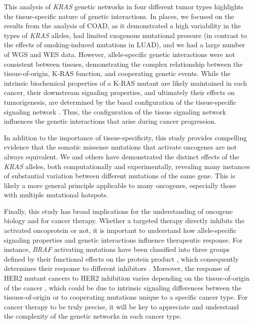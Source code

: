 \documentclass[english, 10pt, letterpaper]{article}
\newcommand{\KRAS}{\emph{KRAS}}
\newcommand{\kras}{K-RAS}
\begin{document}
This analysis of \KRAS{} genetic networks in four different tumor types highlights the tissue-specific nature of genetic interactions. 
In places, we focused on the results from the analysis of COAD, as it demonstrated a high variability in the types of \KRAS{} alleles, had limited exogenous mutational pressure (in contrast to the effects of smoking-induced mutations in LUAD), and we had a large number of WGS and WES data.
However, allele-specific genetic interactions were not consistent between tissues, demonstrating the complex relationship between the tissue-of-origin, \kras{} function, and cooperating genetic events.
While the intrinsic biochemical properties of a \kras{} mutant are likely maintained in each cancer, their downstream signaling properties, and ultimately their effects on tumorigenesis, are determined by the basal configuration of the tissue-specific signaling network \cite{Brubaker2019}.
Thus, the configuration of the tissue signaling network influences the genetic interactions that arise during cancer progression.

In addition to the importance of tissue-specificity, this study provides compelling evidence that the somatic missense mutations that activate oncogenes are not always equivalent.
We and others have demonstrated the distinct effects of the \KRAS{} alleles, both computationally and experimentally, revealing many instances of substantial variation between different mutations of the same gene.
This is likely a more general principle applicable to many oncogenes, especially those with multiple mutational hotspots.

Finally, this study has broad implications for the understanding of oncogene biology and for cancer therapy.
Whether a targeted therapy directly inhibits the activated oncoprotein or not, it is important to understand how allele-specific signaling properties and genetic interactions influence therapeutic response.
For instance, \emph{BRAF} activating mutations have been classified into three groups defined by their functional effects on the protein product \cite{Yao2015BRAFInhibition., Yao2017TumoursRAS.}, which consequently determines their response to different inhibitors \cite{Dagogo-Jack2019, Bracht2019BRAFRationale.}.
Moreover, the response of HER2 mutant cancers to HER2 inhibition varies depending on the tissue-of-origin of the cancer \cite{Hyman2018HERCancers}, which could be due to intrinsic signaling differences between the tissues-of-origin or to cooperating mutations unique to a specific cancer type. 
For cancer therapy to be truly precise, it will be key to appreciate and understand the complexity of the genetic networks in each cancer type.
\end{document}
